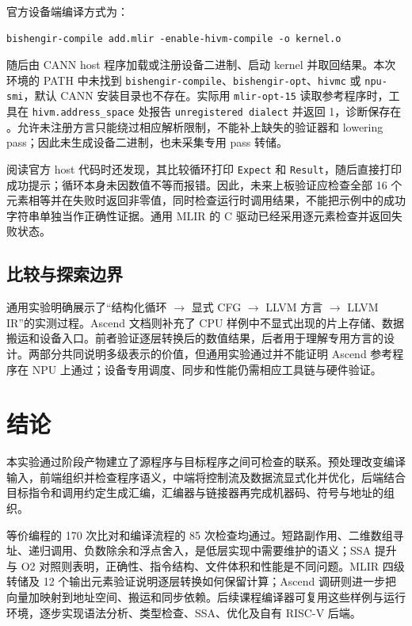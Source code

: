 \documentclass[UTF8,a4paper,10pt,fontset=fandol]{ctexart}
\begin{document}
官方设备端编译方式为：
\par\noindent\begin{minipage}{\linewidth}
\begin{lstlisting}[numbers=none]
bishengir-compile add.mlir -enable-hivm-compile -o kernel.o
\end{lstlisting}
\end{minipage}\par
随后由 CANN host 程序加载或注册设备二进制、启动 kernel 并取回结果。本次环境的 PATH 中未找到 \texttt{bishengir-compile}、\texttt{bishengir-opt}、\texttt{hivmc} 或 \texttt{npu-smi}，默认 CANN 安装目录也不存在。实际用 \texttt{mlir-opt-15} 读取参考程序时，工具在 \texttt{hivm.address\_space} 处报告 \texttt{unregistered dialect} 并返回 1，诊断保存在 。允许未注册方言只能绕过相应解析限制，不能补上缺失的验证器和 lowering pass；因此未生成设备二进制，也未采集专用 pass 转储。

阅读官方 host 代码时还发现，其比较循环打印 \texttt{Expect} 和 \texttt{Result}，随后直接打印成功提示；循环本身未因数值不等而报错。因此，未来上板验证应检查全部 16 个元素相等并在失败时返回非零值，同时检查运行时调用结果，不能把示例中的成功字符串单独当作正确性证据。通用 MLIR 的 C 驱动已经采用逐元素检查并返回失败状态。

\subsection{比较与探索边界}
通用实验明确展示了“结构化循环 $\rightarrow$ 显式 CFG $\rightarrow$ LLVM 方言 $\rightarrow$ LLVM IR”的实测过程。Ascend 文档则补充了 CPU 样例中不显式出现的片上存储、数据搬运和设备入口。前者验证逐层转换后的数值结果，后者用于理解专用方言的设计。两部分共同说明多级表示的价值，但通用实验通过并不能证明 Ascend 参考程序在 NPU 上通过；设备专用调度、同步和性能仍需相应工具链与硬件验证。

\section{结论}
本实验通过阶段产物建立了源程序与目标程序之间可检查的联系。预处理改变编译输入，前端组织并检查程序语义，中端将控制流及数据流显式化并优化，后端结合目标指令和调用约定生成汇编，汇编器与链接器再完成机器码、符号与地址的组织。

等价编程的 170 次比对和编译流程的 85 次检查均通过。短路副作用、二维数组寻址、递归调用、负数除余和浮点舍入，是低层实现中需要维护的语义；SSA 提升与 O2 对照则表明，正确性、指令结构、文件体积和性能是不同问题。MLIR 四级转储及 12 个输出元素验证说明逐层转换如何保留计算；Ascend 调研则进一步把向量加映射到地址空间、搬运和同步依赖。后续课程编译器可复用这些样例与运行环境，逐步实现语法分析、类型检查、SSA、优化及自有 RISC-V 后端。
\end{document}
